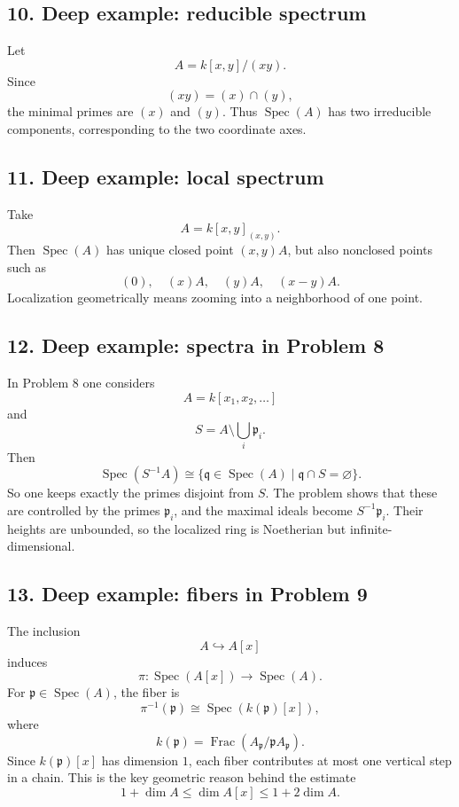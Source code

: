 \documentclass[12pt,a4paper]{article}
\theoremstyle{plain}
\theoremstyle{definition}      %
\begin{document}
\subsection*{10. Deep example: reducible spectrum}

Let
\[
A=k[x,y]/(xy).
\]
Since
\[
(xy)=(x)\cap (y),
\]
the minimal primes are \((x)\) and \((y)\). Thus \(\operatorname{Spec}(A)\) has two irreducible components, corresponding to the two coordinate axes.

\subsection*{11. Deep example: local spectrum}

Take
\[
A=k[x,y]_{(x,y)}.
\]
Then \(\operatorname{Spec}(A)\) has unique closed point \((x,y)A\), but also nonclosed points such as
\[
(0),\quad (x)A,\quad (y)A,\quad (x-y)A.
\]
Localization geometrically means zooming into a neighborhood of one point.

\subsection*{12. Deep example: spectra in Problem 8}

In Problem 8 one considers
\[
A=k[x_1,x_2,\dots]
\]
and
\[
S=A\setminus \bigcup_i \mathfrak p_i.
\]
Then
\[
\operatorname{Spec}(S^{-1}A)
\cong
\{\mathfrak q\in\operatorname{Spec}(A)\mid \mathfrak q\cap S=\varnothing\}.
\]
So one keeps exactly the primes disjoint from \(S\). The problem shows that these are controlled by the primes \(\mathfrak p_i\), and the maximal ideals become \(S^{-1}\mathfrak p_i\). Their heights are unbounded, so the localized ring is Noetherian but infinite-dimensional.

\subsection*{13. Deep example: fibers in Problem 9}

The inclusion
\[
A\hookrightarrow A[x]
\]
induces
\[
\pi:\operatorname{Spec}(A[x])\to \operatorname{Spec}(A).
\]
For \(\mathfrak p\in\operatorname{Spec}(A)\), the fiber is
\[
\pi^{-1}(\mathfrak p)\cong \operatorname{Spec}(k(\mathfrak p)[x]),
\]
where
\[
k(\mathfrak p)=\operatorname{Frac}(A_{\mathfrak p}/\mathfrak pA_{\mathfrak p}).
\]
Since \(k(\mathfrak p)[x]\) has dimension \(1\), each fiber contributes at most one vertical step in a chain. This is the key geometric reason behind the estimate
\[
1+\dim A\le \dim A[x]\le 1+2\dim A.
\]
\end{document}
